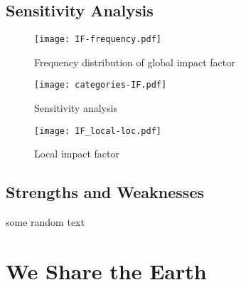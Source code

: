 \documentclass[12pt]{article}
\begin{document}
	\subsection{Sensitivity Analysis}
	
		\begin{figure}
			\centering
			\texttt{[image: IF-frequency.pdf]}
			\caption{Frequency distribution of global impact factor}
			\label{fig:freqIF}
		\end{figure}
	
		\begin{figure}
			\centering
			\texttt{[image: categories-IF.pdf]}
			\caption{Sensitivity analysis}
			\label{fig:IFfactors}
		\end{figure}
		
		\begin{figure}
			\centering
			\texttt{[image: IF\_local-loc.pdf]}
			\caption{Local impact factor}
			\label{fig:IFLocal}
		\end{figure}
		
	\subsection{Strengths and Weaknesses}

		some random text
	
\section*{We Share the Earth}



\newrefcontext
\printbibliography
\end{document}
